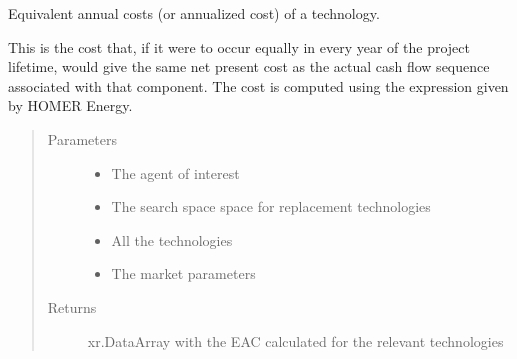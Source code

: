 \documentclass[letterpaper,10pt,english]{sphinxmanual}
\begin{document}
\begin{fulllineitems}
\label{\detokenize{api:muse.objectives.equivalent_annual_cost}}
Equivalent annual costs (or annualized cost) of a technology.

This is the cost that, if it were to occur equally in every year of the
project lifetime, would give the same net present cost as the actual cash
flow sequence associated with that component. The cost is computed using the
 expression given by HOMER Energy.
\begin{quote}\begin{description}
\item[{Parameters}] \leavevmode\begin{itemize}
\item {} 
 \textendash{} The agent of interest

\item {} 
 \textendash{} The search space space for replacement technologies

\item {} 
 \textendash{} All the technologies

\item {} 
 \textendash{} The market parameters

\end{itemize}

\item[{Returns}] \leavevmode
xr.DataArray with the EAC calculated for the relevant technologies

\end{description}\end{quote}

\end{fulllineitems}
\end{document}
